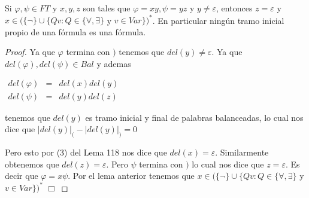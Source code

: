   \begin{proposition}
    \PN Si $\varphi, \psi \in FT$ y $x, y, z$ son tales que $\varphi = xy, \psi = yz$ y $y \neq \varepsilon$,
    entonces $z = \varepsilon$ y $x \in (\{\lnot\} \cup \{Qv: Q \in \{\forall, \exists\}$ y $v \in Var\})^{\ast}$. En
    particular ningún tramo inicial propio de una fórmula es una fórmula.
  \end{proposition}
  \begin{proof}
    Ya que $\varphi $ termina con $)$ tenemos que $del(y)\neq \varepsilon .$ Ya que $del(\varphi ),del(\psi )\in Bal$ y ademas

    $\displaystyle \begin{array}{rcl} del(\varphi ) & =& del(x)del(y) \\ del(\psi ) & =& del(y)del(z) \end{array} $

    tenemos que $del(y)$ es tramo inicial y final de palabras balanceadas, lo cual nos dice que
    $\displaystyle \lvert del(y)\rvert_{(}-\lvert del(y)\rvert_{)}=0 $

    Pero esto por (3) del Lema 118 nos dice que $ del(x)=\varepsilon $. Similarmente obtenemos que $del(z)=\varepsilon $. Pero $\psi $ termina con $)$ lo cual nos dice que $z=\varepsilon $. Es decir que $ \varphi =x\psi $. Por el lema anterior tenemos que $x\in (\{\lnot \}\cup \{Qv:Q\in \{\forall ,\exists \}$ y $v\in Var\})^{\ast }$ $\Box$
  \end{proof}

